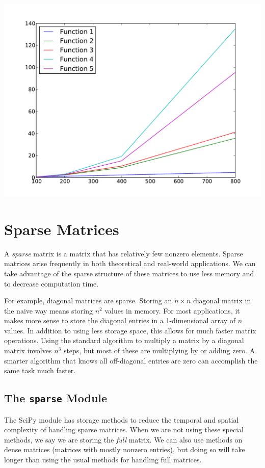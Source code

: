 \begin{problem}
\centering
\includegraphics[width=\textwidth]{complexity_problem.pdf}

\end{problem}

\section*{Sparse Matrices}
A \emph{sparse} matrix is a matrix that has relatively few nonzero elements. 
Sparse matrices arise frequently in both theoretical and real-world applications. 
We can take advantage of the sparse structure of these matrices to use less memory and to decrease computation time.

For example, diagonal matrices are sparse. 
Storing an $n \times n$ diagonal matrix in the naive way means storing $n^2$ values in memory. 
For most applications, it makes more sense to store the diagonal entries in a 1-dimensional array of $n$ values. 
In addition to using less storage space, this allows for much faster matrix operations. 
Using the standard algorithm to multiply a matrix by a diagonal matrix involves $n^3$ steps, but most of these are multiplying by or adding zero. 
A smarter algorithm that knows all off-diagonal entries are zero can accomplish the same task much faster.

\subsection*{The \texttt{sparse} Module}
The SciPy module  has storage methods to reduce the temporal and spatial complexity of handling sparse matrices.  
When we are not using these special methods, we say we are storing the \emph{full} matrix. 
We can also use  methods on dense matrices (matrices with mostly nonzero entries), but doing so will take longer than using the usual methods for handling full matrices. 

